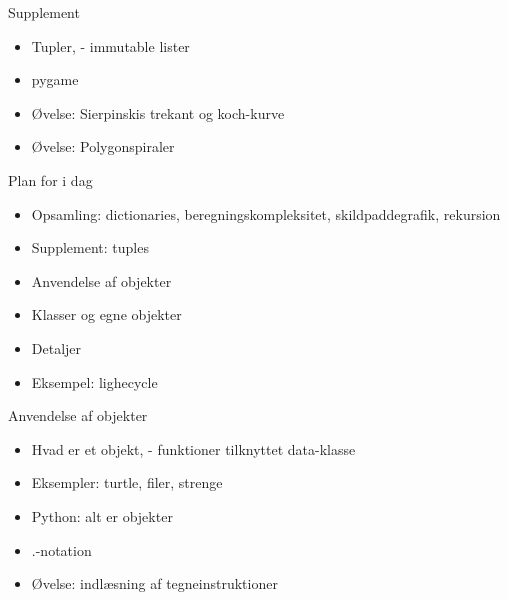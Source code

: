 \documentclass[a4paper,landscape]{slides}
\begin{document}
\begin{slide}
	\begin{center} {\large 
            Supplement
	} \end{center}
	\begin{itemize} \addtolength{\itemsep}{-\baselineskip}
                \item Tupler, - immutable lister
                \item pygame
                \item Øvelse: Sierpinskis trekant og koch-kurve
                \item Øvelse: Polygonspiraler
	\end{itemize}
\end{slide}

\begin{slide}
	\begin{center} {\large 
            Plan for i dag
	} \end{center}
	\begin{itemize} \addtolength{\itemsep}{-\baselineskip}
		\item Opsamling: dictionaries, beregningskompleksitet, skildpaddegrafik, rekursion
		\item Supplement: tuples
                \item Anvendelse af objekter
		\item Klasser og egne objekter
		\item Detaljer
                \item Eksempel: lighecycle
	\end{itemize}
\end{slide}


\begin{slide}
	\begin{center} {\large 
            Anvendelse af objekter
	} \end{center}
	\begin{itemize} \addtolength{\itemsep}{-\baselineskip}
                \item Hvad er et objekt, - funktioner tilknyttet data-klasse
                \item Eksempler: turtle, filer, strenge
                \item Python: alt er objekter
                \item .-notation
                \item Øvelse: indlæsning af tegneinstruktioner
	\end{itemize}
\end{slide}
\end{document}
